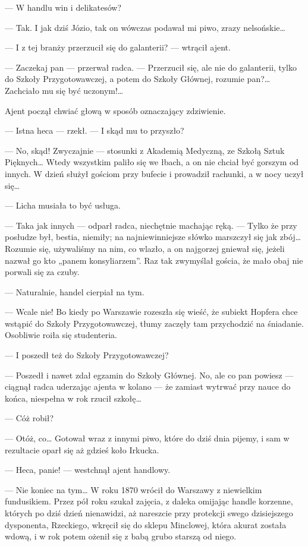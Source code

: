 \documentclass{book}
\begin{document}
— W handlu win i delikatesów?

— Tak. I jak dziś Józio, tak on wówczas podawał mi piwo, zrazy nelsońskie…

— I z tej branży przerzucił się do galanterii? — wtrącił ajent.

— Zaczekaj pan — przerwał radca. — Przerzucił się, ale nie do galanterii, tylko do Szkoły Przygotowawczej, a potem do Szkoły Głównej, rozumie pan?… Zachciało mu się być uczonym!…

Ajent począł chwiać głową w sposób oznaczający zdziwienie.

— Istna heca — rzekł. — I skąd mu to przyszło?

— No, skąd! Zwyczajnie — stosunki z Akademią Medyczną, ze Szkołą Sztuk Pięknych… Wtedy wszystkim paliło się we łbach, a on nie chciał być gorszym od innych. W dzień służył gościom przy bufecie i prowadził rachunki, a w nocy uczył się…

— Licha musiała to być usługa.

— Taka jak innych — odparł radca, niechętnie machając ręką. — Tylko że przy posłudze był, bestia, niemiły; na najniewinniejsze słówko marszczył się jak zbój… Rozumie się, używaliśmy na nim, co wlazło, a on najgorzej gniewał się, jeżeli nazwał go kto „panem konsyliarzem”. Raz tak zwymyślał gościa, że mało obaj nie porwali się za czuby.

— Naturalnie, handel cierpiał na tym.

— Wcale nie! Bo kiedy po Warszawie rozeszła się wieść, że subiekt Hopfera chce wstąpić do Szkoły Przygotowawczej, tłumy zaczęły tam przychodzić na śniadanie. Osobliwie roiła się studenteria.

— I poszedł też do Szkoły Przygotowawczej?

— Poszedł i nawet zdał egzamin do Szkoły Głównej. No, ale co pan powiesz — ciągnął radca uderzając ajenta w kolano — że zamiast wytrwać przy nauce do końca, niespełna w rok rzucił szkołę…



— Cóż robił?

— Otóż, co… Gotował wraz z innymi piwo, które do dziś dnia pijemy, i sam w rezultacie oparł się aż gdzieś koło Irkucka.

— Heca, panie! — westchnął ajent handlowy.

— Nie koniec na tym… W roku 1870 wrócił do Warszawy z niewielkim fundusikiem. Przez pół roku szukał zajęcia, z daleka omijając handle korzenne, których po dziś dzień nienawidzi, aż nareszcie przy protekcji swego dzisiejszego dysponenta, Rzeckiego, wkręcił się do sklepu Minclowej, która akurat została wdową, i w rok potem ożenił się z babą grubo starszą od niego.
\end{document}
